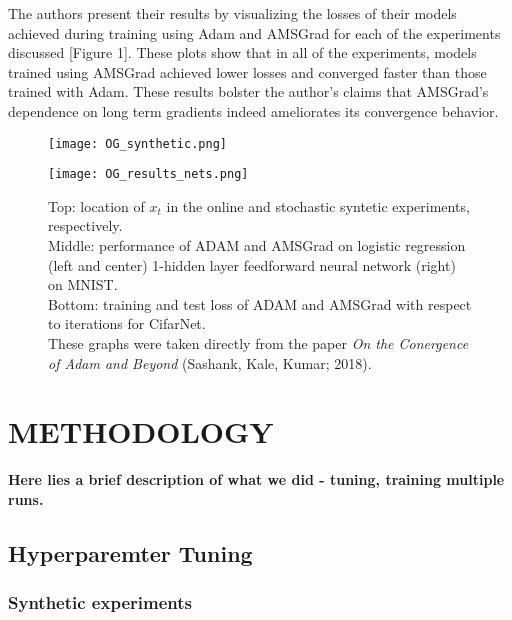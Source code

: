 \documentclass[letterpaper, 10 pt, conference]{ieeeconf}  %
\begin{document}
The authors present their results by visualizing the losses of their models achieved during training using Adam and AMSGrad for each of the experiments discussed [Figure 1]. These plots show that in all of the experiments, models trained using AMSGrad achieved lower losses and converged faster than those trained with Adam. These results bolster the author's claims that AMSGrad's dependence on long term gradients indeed ameliorates its convergence behavior.
\begin{figure*}
\begin{minipage}{1\textwidth}
\centering
\begin{minipage}{0.55\textwidth}
  \centering
  \texttt{[image: OG\_synthetic.png]}
  \label{fig:test2}
\end{minipage}%
\centering
\break
\begin{minipage}{0.9\textwidth}
  \centering
  \texttt{[image: OG\_results\_nets.png]}
  \label{fig:test2}
\end{minipage}%
\end{minipage}
\caption[]{Top: location of $x_t$ in the online and stochastic syntetic experiments, respectively. \\
Middle: performance of ADAM and AMSGrad on logistic regression (left and center) 1-hidden layer feedforward neural network (right) on MNIST.\\
Bottom: training and test loss of ADAM and AMSGrad with respect to iterations for CifarNet.\\
These graphs were taken directly from the paper \emph{On the Conergence of Adam and Beyond} (Sashank, Kale, Kumar; 2018).} 
\end{figure*}    

\section{METHODOLOGY}

\textbf{Here lies a brief description of what we did - tuning, training multiple runs.}

\subsection{Hyperparemter Tuning}

\subsubsection{Synthetic experiments}
\end{document}
